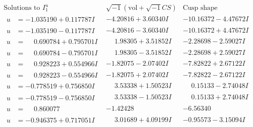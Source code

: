 \documentclass[1p]{elsarticle_modified}
\theoremstyle{definition}
\newcommand{\I}{\sqrt{-1}}
\begin{document}
$$\begin{array}{c|c|c}  
\text{Solutions to }I^u_{1}& \I (\text{vol} + \sqrt{-1}CS) & \text{Cusp shape}\\
 \hline 
\begin{aligned}
u &= -1.035190 + 0.117787 I\end{aligned}
 & -4.20816 + 3.60340 I & -10.16372 - 4.47672 I \\ \hline\begin{aligned}
u &= -1.035190 - 0.117787 I\end{aligned}
 & -4.20816 - 3.60340 I & -10.16372 + 4.47672 I \\ \hline\begin{aligned}
u &= \phantom{-}0.690784 + 0.795701 I\end{aligned}
 & \phantom{-}1.98305 + 3.51852 I & -2.28698 - 2.59027 I \\ \hline\begin{aligned}
u &= \phantom{-}0.690784 - 0.795701 I\end{aligned}
 & \phantom{-}1.98305 - 3.51852 I & -2.28698 + 2.59027 I \\ \hline\begin{aligned}
u &= \phantom{-}0.928223 + 0.554966 I\end{aligned}
 & -1.82075 - 2.07402 I & -7.82822 + 2.67122 I \\ \hline\begin{aligned}
u &= \phantom{-}0.928223 - 0.554966 I\end{aligned}
 & -1.82075 + 2.07402 I & -7.82822 - 2.67122 I \\ \hline\begin{aligned}
u &= -0.778519 + 0.756850 I\end{aligned}
 & \phantom{-}3.53338 + 1.50523 I & \phantom{-}0.15133 - 2.74048 I \\ \hline\begin{aligned}
u &= -0.778519 - 0.756850 I\end{aligned}
 & \phantom{-}3.53338 - 1.50523 I & \phantom{-}0.15133 + 2.74048 I \\ \hline\begin{aligned}
u &= \phantom{-}0.860077\phantom{ +0.000000I}\end{aligned}
 & -1.42428\phantom{ +0.000000I} & -6.56340\phantom{ +0.000000I} \\ \hline\begin{aligned}
u &= -0.946375 + 0.717051 I\end{aligned}
 & \phantom{-}3.01689 + 4.09199 I & -0.95573 - 3.15094 I \\ \hline\begin{aligned}

\end{aligned}
\end{array}$$
\end{document}
